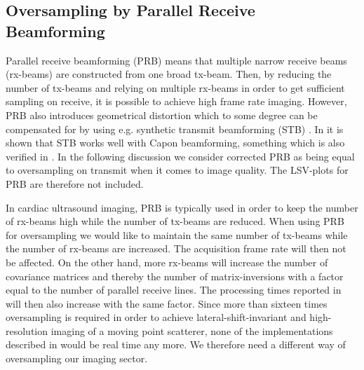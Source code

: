 \documentclass[draftcls]{IEEEtran}
\begin{document}
\subsection{Oversampling by Parallel Receive Beamforming}
Parallel receive beamforming (PRB) means that multiple narrow receive beams (rx-beams) are constructed from one broad tx-beam. Then, by reducing the number of tx-beams and relying on multiple rx-beams in order to get sufficient sampling on receive, it is possible to achieve high frame rate imaging. However, PRB also introduces geometrical distortion which to some degree can be compensated for by using e.g. synthetic transmit beamforming (STB) \cite{Hergum2007, Denarie2013}. In \cite{Rabinovich2013} it is shown that STB works well with Capon beamforming, something which is also verified in \cite{Asen}. In the following discussion we consider corrected PRB as being equal to oversampling on transmit when it comes to image quality. The LSV-plots for PRB are therefore not included.

In cardiac ultrasound imaging, PRB is typically used in order to keep the number of rx-beams high while the number of tx-beams are reduced. When using PRB for oversampling we would like to maintain the same number of tx-beams while the number of rx-beams are increased. The acquisition frame rate will then not be affected. On the other hand, more rx-beams will increase the number of covariance matrices and thereby the number of matrix-inversions with a factor equal to the number of parallel receive lines. The processing times reported in \cite{Asen} will then also increase with the same factor. Since more than sixteen times oversampling is required in order to achieve lateral-shift-invariant and high-resolution imaging of a moving point scatterer, none of the implementations described in \cite{Asen} would be real time any more. We therefore need a different way of oversampling our imaging sector.
\end{document}
